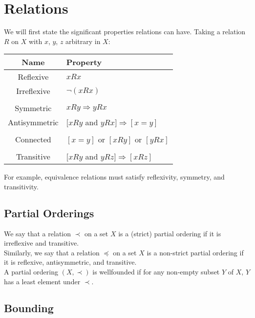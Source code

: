 \section{Relations}

We will first state the significant properties relations
can have. Taking a relation $R$ on $X$ with $x$, $y$, $z$
arbitrary in $X$: \begin{center}
    \begin{tabular}{ c l }
        \textbf{Name} & \textbf{Property} \\
        \hline
        Reflexive & $xRx$ \\
        Irreflexive & $\neg(xRx)$ \\
        \\
        Symmetric & $xRy \Rightarrow yRx$ \\
        Antisymmetric & $[xRy$ and $yRx] \Rightarrow [x = y]$ \\
        \\
        Connected & $[x = y]$ or $[xRy]$ or $[yRx]$ \\
        \\
        Transitive & $[xRy$ and $yRz] \Rightarrow [xRz]$ \\
    \end{tabular}
\end{center} For example, equivalence relations must satisfy 
reflexivity, symmetry, and transitivity.

\subsection{Partial Orderings}

We say that a relation $\prec$ on a set $X$ is a (strict) partial
ordering if it is irreflexive and transitive.
\\[\baselineskip]
Similarly, we say that a relation $\preceq$ on a set $X$ is a non-strict
partial ordering if it is reflexive, antisymmetric, and transitive.
\\[\baselineskip]
A partial ordering $(X, \prec)$ is wellfounded if for any non-empty subset
$Y$ of $X$, $Y$ has a least element under $\prec$.

\vfill

\subsection{Bounding}

